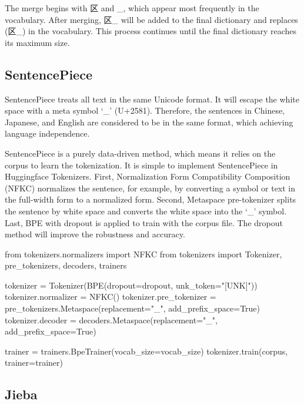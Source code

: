 \begin{CJK}{UTF8}{gbsn}
The merge begins with 区 and \_, which appear most frequently in the vocabulary. After merging, 区\_ will be added to the final dictionary and replaces (区\enspace\_) in the vocabulary. This process continues until the final dictionary reaches its maximum size.
\end{CJK}

\subsection{SentencePiece} \label{sec:sentencepiece}

SentencePiece treats all text in the same Unicode format. It will escape the white space with a meta symbol `\_' (U+2581). Therefore, the sentences in Chinese, Japanese, and English are considered to be in the same format, which achieving language independence. 

SentencePiece is a purely data-driven method, which means it relies on the corpus to learn the tokenization. It is simple to implement SentencePiece in Huggingface Tokenizers. First, Normalization Form Compatibility Composition (NFKC) normalizes the sentence, for example, by converting a symbol or text in the full-width form to a normalized form. Second, Metaspace pre-tokenizer splits the sentence by white space and converts the white space into the `\_' symbol. Last, BPE with dropout is applied to train with the corpus file. The dropout method will improve the robustness and accuracy.

\vspace{0.5cm}

\begin{python}
from tokenizers.normalizers import NFKC
from tokenizers import Tokenizer, pre_tokenizers, decoders, trainers

tokenizer = Tokenizer(BPE(dropout=dropout, unk_token="[UNK]"))
tokenizer.normalizer = NFKC()
tokenizer.pre_tokenizer = pre_tokenizers.Metaspace(replacement="_", add_prefix_space=True)
tokenizer.decoder = decoders.Metaspace(replacement="_", add_prefix_space=True)

trainer = trainers.BpeTrainer(vocab_size=vocab_size)
tokenizer.train(corpus, trainer=trainer)
\end{python}

\subsection{Jieba} \label{sec:jieba}


